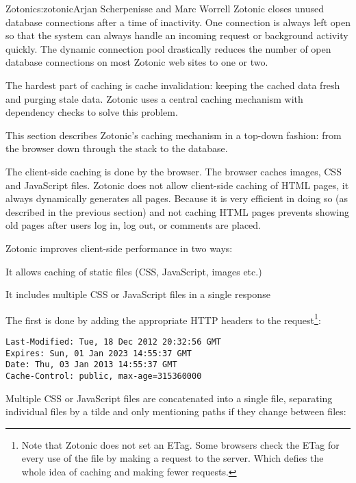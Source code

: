 \begin{aosachapter}{Zotonic}{s:zotonic}{Arjan Scherpenisse and Marc Worrell}
Zotonic closes unused database connections after a time of inactivity.
One connection is always left open so that the system can always handle
an incoming request or background activity quickly. The dynamic
connection pool drastically reduces the number of open database
connections on most Zotonic web sites to one or two.


The hardest part of caching is cache invalidation: keeping the cached
data fresh and purging stale data. Zotonic uses a central caching
mechanism with dependency checks to solve this problem.

This section describes Zotonic's caching mechanism in a top-down
fashion: from the browser down through the stack to the database.


The client-side caching is done by the browser. The browser caches
images, CSS and JavaScript files. Zotonic does not allow client-side
caching of HTML pages, it always dynamically generates all pages.
Because it is very efficient in doing so (as described in the previous
section) and not caching HTML pages prevents showing old pages after
users log in, log out, or comments are placed.

Zotonic improves client-side performance in two ways:

\begin{aosaenumerate}
\def\labelenumi{\arabic{enumi}.}

\item
  It allows caching of static files (CSS, JavaScript, images etc.)
\item
  It includes multiple CSS or JavaScript files in a single response
\end{aosaenumerate}

\noindent The first is done by adding the appropriate HTTP headers to the
request\footnote{Note that Zotonic does not set an ETag. Some browsers
  check the ETag for every use of the file by making a request to the
  server. Which defies the whole idea of caching and making fewer
  requests.}:

\begin{verbatim}
Last-Modified: Tue, 18 Dec 2012 20:32:56 GMT
Expires: Sun, 01 Jan 2023 14:55:37 GMT
Date: Thu, 03 Jan 2013 14:55:37 GMT
Cache-Control: public, max-age=315360000
\end{verbatim}

\noindent Multiple CSS or JavaScript files are concatenated into a single file,
separating individual files by a tilde and only mentioning paths if they
change between files:


\end{aosachapter}
